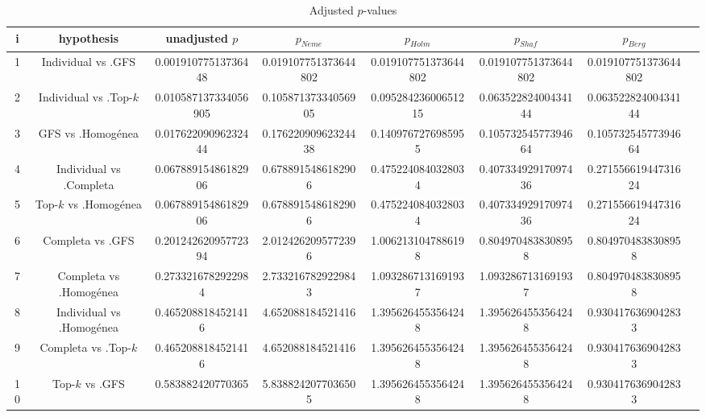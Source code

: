 \documentclass[a4paper,10pt]{article}
\begin{document}
\begin{landscape}
\begin{table}[!htp]
\centering\tiny
\caption{Adjusted $p$-values}
\begin{tabular}{cccccccc}
i&hypothesis&unadjusted $p$&$p_{Neme}$&$p_{Holm}$&$p_{Shaf}$&$p_{Berg}$\\
\hline
1&Individual vs .GFS&0.00191077513736448&0.019107751373644802&0.019107751373644802&0.019107751373644802&0.019107751373644802\\
2&Individual vs .Top-$k$&0.010587137334056905&0.10587137334056905&0.09528423600651215&0.06352282400434144&0.06352282400434144\\
3&GFS vs .Homogénea&0.01762209096232444&0.17622090962324438&0.1409767276985955&0.10573254577394664&0.10573254577394664\\
4&Individual vs .Completa&0.06788915486182906&0.6788915486182906&0.4752240840328034&0.40733492917097436&0.27155661944731624\\
5&Top-$k$ vs .Homogénea&0.06788915486182906&0.6788915486182906&0.4752240840328034&0.40733492917097436&0.27155661944731624\\
6&Completa vs .GFS&0.20124262095772394&2.0124262095772396&1.0062131047886198&0.8049704838308958&0.8049704838308958\\
7&Completa vs .Homogénea&0.2733216782922984&2.7332167829229843&1.0932867131691937&1.0932867131691937&0.8049704838308958\\
8&Individual vs .Homogénea&0.4652088184521416&4.652088184521416&1.3956264553564248&1.3956264553564248&0.9304176369042833\\
9&Completa vs .Top-$k$&0.4652088184521416&4.652088184521416&1.3956264553564248&1.3956264553564248&0.9304176369042833\\
10&Top-$k$ vs .GFS&0.583882420770365&5.8388242077036505&1.3956264553564248&1.3956264553564248&0.9304176369042833\\
\hline
\end{tabular}
\end{table}

\end{landscape}
\end{document}
